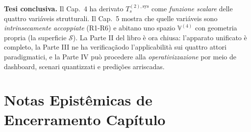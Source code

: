 \Hypoth{} \textbf{Tesi conclusiva.} Il Cap.~4 ha derivato
\(T_s^{(2),\text{sys}}\) come \emph{funzione scalare} delle quattro
variáveis strutturali. Il Cap.~5 mostra che quelle variáveis sono
\emph{intrinsecamente accoppiate} (R1-R6) e abitano uno spazio
\(\mathbb{V}^{(4)}\) con geometria propria (la superficie
\(\mathcal{S}\)). La Parte II del libro è ora chiusa: l'apparato
unificato è completo, la Parte III ne ha verificaçãodo l'applicabilità sui
quattro attori paradigmatici, e la Parte IV può procedere alla
\emph{operativizzazione} por meio de dashboard, scenari quantizzati e
predições arriscadas.



\section{Notas Epistêmicas de Encerramento
Capítulo}\label{note-epistemiche-di-chiusura-capítulo}

